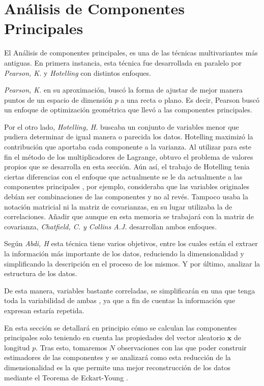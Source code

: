 \newpage
\section{Análisis de Componentes Principales}
\noindent El Análisis de componentes principales, es una de las técnicas multivariantes más antiguas. En primera instancia, esta técnica fue desarrollada en paralelo por \emph{Pearson, K.} \cite{Pearson 1901} y \emph{Hotelling} \cite{Hotelling 1933} con distintos enfoques. 

\noindent \emph{Pearson, K.}\cite{Pearson 1901} en su aproximación, buscó la forma de ajustar de mejor manera puntos de un espacio de dimensión $p$ a una recta o plano. Es decir, Pearson buscó un enfoque de optimización geométrica que llevó a las componentes principales.

\noindent Por el otro lado, \emph{Hotelling, H.} \cite{Hotelling 1933} buscaba un conjunto de variables menor que pudiera determinar de igual manera o parecida los datos. Hotelling maximizó la contribución que aportaba cada componente a la varianza. Al utilizar para este fin el método de los multiplicadores de Lagrange, obtuvo el problema de valores propios que se desarrolla en esta sección. Aún así, el trabajo de Hotelling tenia ciertas diferencias con el enfoque que actualmente se le da actualmente a las componentes principales \cite{Jollife 1986}, por ejemplo, consideraba que las variables originales  debían ser combinaciones de las componentes y no al revés. Tampoco usaba la notación matricial ni la matriz de covarianzas, en su lugar utilizaba la de correlaciones. Añadir que aunque en esta memoria se trabajará con la matriz de covarianza, \emph{Chatfield, C. y Collins A.J.}\cite{Chatfield 1989} desarrollan ambos enfoques. 

\noindent Según \emph{Abdi, H} \cite{Abdi 2010} esta técnica tiene varios objetivos, entre los cuales están el extraer la información más importante de los datos, reduciendo la dimensionalidad y simplificando la descripción en el proceso de los mismos. Y por último, analizar la estructura de los datos. 


\noindent De esta manera, variables bastante correladas, se simplificarán en una que tenga toda la variabilidad de ambas \cite{Chatfield 1989}, \cite{Everitt 2011} ya que a fin de cuentas la información que expresan estaría repetida. 

\noindent En esta sección se detallará en principio cómo se calculan las componentes principales solo teniendo en cuenta las propiedades del vector aleatorio $\mathbf{x}$ de longitud $p$. Tras esto, tomaremos $N$ observaciones con las que poder construir estimadores de las componentes y se analizará como esta reducción de la dimensionalidad es la que permite una mejor reconstrucción de los datos mediante el Teorema de Eckart-Young \cite{Eckart 1936}. 

